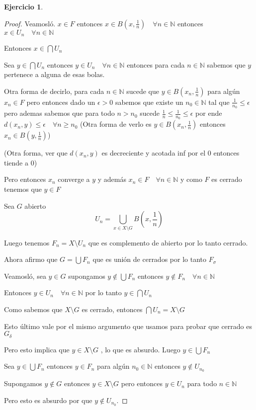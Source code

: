 \documentclass[12pt]{report}
\newcommand{\N}{\mathbb{N}}
\theoremstyle{definition}
\newtheorem{ej}{Ejercicio}
\begin{document}
\begin{ej}
\begin{enumerate}
\begin{proof}
  Veamosló. $x \in F$ entonces $x \in B(x,\frac{1}{n})\quad \forall n \in \N$ entonces $x \in U_n \quad \forall n \in \N$

Entonces $x \in \bigcap U_n$

Sea $y \in \bigcap U_n$ entonces $y \in U_n \quad \forall n \in \N$ entonces para cada $n \in \N$ sabemos que $y $ pertenece a alguna de esas bolas.

Otra forma de decirlo, para cada $n\in \N$ sucede que $y \in B(x_n,\frac{1}{n})$ para algún $x_n \in F$ pero entonces dado un $\epsilon > 0$ sabemos que existe un $n_0 \in \N$ tal que $\frac{1}{n_0} \leq \epsilon$ pero ademas sabemos que para todo $n > n_0 $ sucede $\frac{1}{n} \leq \frac{1}{n_0} \leq \epsilon $ por ende $d(x_n , y) \leq \epsilon \quad \forall n \geq n_0$ (Otra forma de verlo es $y \in B(x_n,\frac{1}{n})$ entonces $x_n \in B(y,\frac{1}{n})$)

(Otra forma, ver que $d(x_n,y)$ es decreciente y acotada inf por el 0 entonces tiende a 0)

Pero entonces $x_n$ converge a $y$ y además $x_n \in F \quad \forall n \in \N$ y como $F$ es cerrado tenemos que $y \in F$

Sea $G$ abierto
$$U_n = \bigcup_{x \in X \setminus G}B(x,\frac{1}{n}) $$

Luego tenemos $F_n = X \setminus U_n$ que es complemento de abierto por lo tanto cerrado.

Ahora afirmo que $G = \bigcup F_n$ que es unión de cerrados por lo tanto $F_{\sigma}$

Veamosló, sea $y \in G$ supongamos $y \notin \bigcup F_n $ entonces $y \notin F_n \quad \forall n \in \N$

Entonces $y \in U_n \quad \forall n \in \N$ por lo tanto $y \in \bigcap U_n$ 

Como sabemos que $X \setminus G$ es cerrado, entonces $\bigcap U_n = X\setminus G$ 

Esto último vale por el mismo argumento que usamos para probar que cerrado es $G_{\delta}$ 

Pero esto implica que $y \in X \setminus G $ , lo que es absurdo. Luego $y \in \bigcup F_n$

Sea $y \in \bigcup F_n$ entonces $y \in F_n$ para algún $ n_0 \in \N$ entonces $y \notin U_{n_0}$ 

Supongamos $y \notin G$ entonces $y \in X \setminus G$ pero entonces $y \in U_n$ para todo $n \in \N$ 

Pero esto es absurdo por que $y \notin U_{n_0}$. 


\end{proof}
\end{enumerate}
\end{ej}
\end{document}
